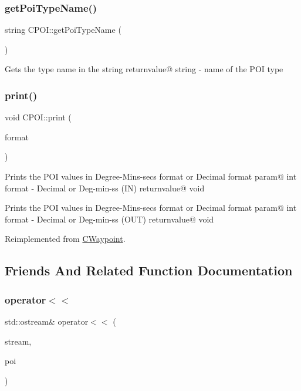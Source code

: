 \subsubsection{\texorpdfstring{get\+Poi\+Type\+Name()}{getPoiTypeName()}}
{\footnotesize\ttfamily string C\+P\+O\+I\+::get\+Poi\+Type\+Name (\begin{DoxyParamCaption}{ }\end{DoxyParamCaption})}

Gets the type name in the string returnvalue@ string -\/ name of the P\+OI type \mbox{\label{classCPOI_a2b65d12e722c89a8a105620726195d10}} 
\subsubsection{\texorpdfstring{print()}{print()}}
{\footnotesize\ttfamily void C\+P\+O\+I\+::print (\begin{DoxyParamCaption}\item[{int}]{format }\end{DoxyParamCaption})\hspace{0.3cm}{\ttfamily [virtual]}}

Prints the P\+OI values in Degree-\/\+Mins-\/secs format or Decimal format param@ int format -\/ Decimal or Deg-\/min-\/ss (IN) returnvalue@ void

Prints the P\+OI values in Degree-\/\+Mins-\/secs format or Decimal format param@ int format -\/ Decimal or Deg-\/min-\/ss (O\+UT) returnvalue@ void 

Reimplemented from \hyperlink{classCWaypoint_a9a4177a2734842c9395658cb60a70c24}{C\+Waypoint}.



\subsection{Friends And Related Function Documentation}
\mbox{\label{classCPOI_ad0c53792637fc266cb40d31e21c8a68f}} 
\subsubsection{\texorpdfstring{operator$<$$<$}{operator<<}}
{\footnotesize\ttfamily std\+::ostream\& operator$<$$<$ (\begin{DoxyParamCaption}\item[{std\+::ostream \&}]{stream,  }\item[{\hyperlink{classCPOI}{C\+P\+OI} const \&}]{poi }\end{DoxyParamCaption})\hspace{0.3cm}{\ttfamily [friend]}}


